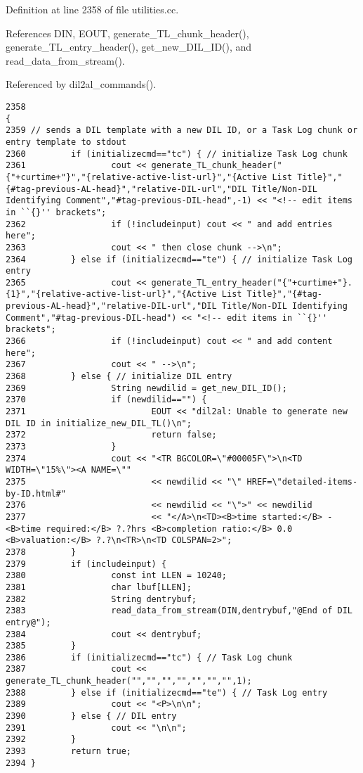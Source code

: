 Definition at line 2358 of file utilities.cc.

References DIN, EOUT, generate\_\-TL\_\-chunk\_\-header(), generate\_\-TL\_\-entry\_\-header(), get\_\-new\_\-DIL\_\-ID(), and read\_\-data\_\-from\_\-stream().

Referenced by dil2al\_\-commands().



\footnotesize\begin{verbatim}2358                                                                     {
2359 // sends a DIL template with a new DIL ID, or a Task Log chunk or entry template to stdout
2360         if (initializecmd=="tc") { // initialize Task Log chunk
2361                 cout << generate_TL_chunk_header("{"+curtime+"}","{relative-active-list-url}","{Active List Title}","{#tag-previous-AL-head}","relative-DIL-url","DIL Title/Non-DIL Identifying Comment","#tag-previous-DIL-head",-1) << "<!-- edit items in ``{}'' brackets";
2362                 if (!includeinput) cout << " and add entries here";
2363                 cout << " then close chunk -->\n";
2364         } else if (initializecmd=="te") { // initialize Task Log entry
2365                 cout << generate_TL_entry_header("{"+curtime+"}.{1}","{relative-active-list-url}","{Active List Title}","{#tag-previous-AL-head}","relative-DIL-url","DIL Title/Non-DIL Identifying Comment","#tag-previous-DIL-head") << "<!-- edit items in ``{}'' brackets";
2366                 if (!includeinput) cout << " and add content here";
2367                 cout << " -->\n";
2368         } else { // initialize DIL entry
2369                 String newdilid = get_new_DIL_ID();
2370                 if (newdilid=="") {
2371                         EOUT << "dil2al: Unable to generate new DIL ID in initialize_new_DIL_TL()\n";
2372                         return false;
2373                 }
2374                 cout << "<TR BGCOLOR=\"#00005F\">\n<TD WIDTH=\"15%\"><A NAME=\""
2375                         << newdilid << "\" HREF=\"detailed-items-by-ID.html#"
2376                         << newdilid << "\">" << newdilid
2377                         << "</A>\n<TD><B>time started:</B> - <B>time required:</B> ?.?hrs <B>completion ratio:</B> 0.0 <B>valuation:</B> ?.?\n<TR>\n<TD COLSPAN=2>";
2378         }
2379         if (includeinput) {
2380                 const int LLEN = 10240;
2381                 char lbuf[LLEN];
2382                 String dentrybuf;
2383                 read_data_from_stream(DIN,dentrybuf,"@End of DIL entry@");
2384                 cout << dentrybuf;
2385         }
2386         if (initializecmd=="tc") { // Task Log chunk
2387                 cout << generate_TL_chunk_header("","","","","","","",1);
2388         } else if (initializecmd=="te") { // Task Log entry
2389                 cout << "<P>\n\n";
2390         } else { // DIL entry
2391                 cout << "\n\n";
2392         }
2393         return true;
2394 }
\end{verbatim}\normalsize 
{}
